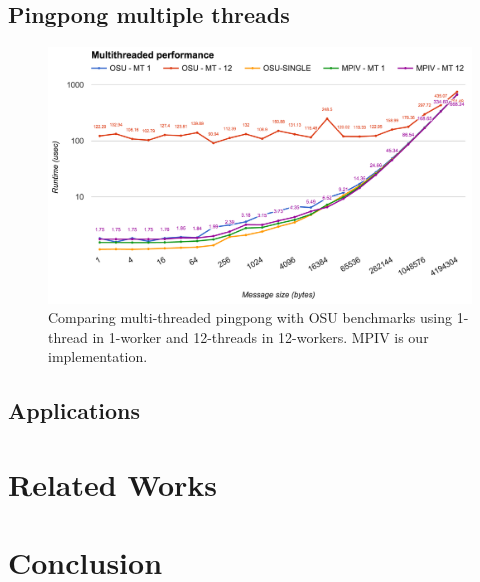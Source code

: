 \documentclass[11pt]{article}
\begin{document}
\subsection{Pingpong multiple threads}
\begin{figure}[h!]
  \centering 
  \includegraphics[width=\textwidth]{fig/pingpong.png}
  \caption{Comparing multi-threaded pingpong with OSU benchmarks using 1-thread
  in 1-worker and 12-threads in 12-workers. MPIV is our implementation.}
\end{figure}

\newpage

\subsection{Applications}
\section{Related Works}
\section{Conclusion}
\end{document}
